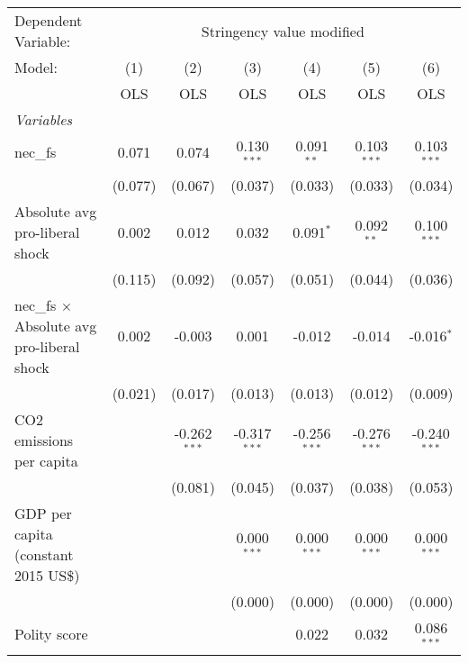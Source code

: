 
\begingroup
\centering
\begin{tabular}{lcccccc}
   \toprule
   Dependent Variable: & \multicolumn{6}{c}{Stringency value modified}\\
   Model:                                            & (1)     & (2)            & (3)            & (4)            & (5)            & (6)\\  
                                                     &  OLS    & OLS            & OLS            & OLS            & OLS            & OLS\\  
   \midrule
   \emph{Variables}\\
   nec\_fs                                           & 0.071   & 0.074          & 0.130$^{***}$  & 0.091$^{**}$   & 0.103$^{***}$  & 0.103$^{***}$\\   
                                                     & (0.077) & (0.067)        & (0.037)        & (0.033)        & (0.033)        & (0.034)\\   
   Absolute avg pro-liberal shock                    & 0.002   & 0.012          & 0.032          & 0.091$^{*}$    & 0.092$^{**}$   & 0.100$^{***}$\\   
                                                     & (0.115) & (0.092)        & (0.057)        & (0.051)        & (0.044)        & (0.036)\\   
   nec\_fs $\times$ Absolute avg pro-liberal shock   & 0.002   & -0.003         & 0.001          & -0.012         & -0.014         & -0.016$^{*}$\\   
                                                     & (0.021) & (0.017)        & (0.013)        & (0.013)        & (0.012)        & (0.009)\\   
   CO2 emissions per capita                          &         & -0.262$^{***}$ & -0.317$^{***}$ & -0.256$^{***}$ & -0.276$^{***}$ & -0.240$^{***}$\\   
                                                     &         & (0.081)        & (0.045)        & (0.037)        & (0.038)        & (0.053)\\   
   GDP per capita (constant 2015 US\$)               &         &                & 0.000$^{***}$  & 0.000$^{***}$  & 0.000$^{***}$  & 0.000$^{***}$\\   
                                                     &         &                & (0.000)        & (0.000)        & (0.000)        & (0.000)\\   
   Polity score                                      &         &                &                & 0.022          & 0.032          & 0.086$^{***}$\\   

\end{tabular}

